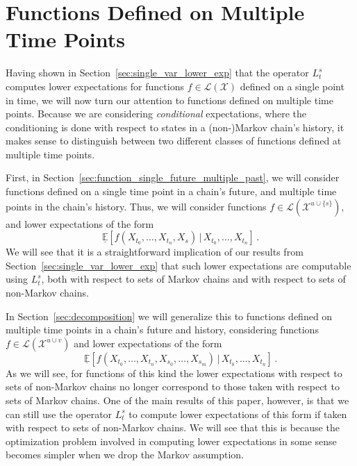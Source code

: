 \documentclass[10pt]{paper}
\theoremstyle{definition}
\newcommand{\states}{\mathcal{X}}
\newcommand{\gambles}{\mathcal{L}}
\newcommand{\gamblesX}{\gambles(\states)}
\begin{document}
\section{Functions Defined on Multiple Time Points}\label{sec:funcs_multi_time_points}

Having shown in Section~\ref{sec:single_var_lower_exp} that the operator $L_t^s$ computes lower expectations for functions $f\in\gamblesX$ defined on a single point in time, we will now turn our attention to functions defined on multiple time points. Because we are considering \emph{conditional} expectations, where the conditioning is done with respect to states in a (non-)Markov chain's history, it makes sense to distinguish between two different classes of functions defined at multiple time points. 

First, in Section~\ref{sec:function_single_future_multiple_past}, we will consider functions defined on a single time point in a chain's future, and multiple time points in the chain's history. Thus, we will consider functions $f\in\gambles(\states^{u\cup\{s\}})$, and lower expectations of the form
\begin{equation*}
\underline{\mathbb{E}}\left[f(X_{t_0},\ldots,X_{t_n},X_s)\,\vert\,X_{t_0},\ldots,X_{t_n}\right]\,.
\end{equation*}
We will see that it is a straightforward implication of our results from Section~\ref{sec:single_var_lower_exp} that such lower expectations are computable using $L_t^s$, both with respect to sets of Markov chains and with respect to sets of non-Markov chains.

In Section~\ref{sec:decomposition} we will generalize this to functions defined on multiple time points in a chain's future and history, considering functions $f\in\gambles(\states^{u\cup v})$ and lower expectations of the form
\begin{equation*}
\underline{\mathbb{E}}\left[f(X_{t_0},\ldots,X_{t_n},X_{s_0},\ldots,X_{s_m})\,\vert\,X_{t_0},\ldots,X_{t_n}\right]\,.
\end{equation*}
As we will see, for functions of this kind the lower expectations with respect to sets of non-Markov chains no longer correspond to those taken with respect to sets of Markov chains. One of the main results of this paper, however, is that we can still use the operator $L_t^s$ to compute lower expectations of this form if taken with respect to sets of non-Markov chains. We will see that this is because the optimization problem involved in computing lower expectations in some sense becomes simpler when we drop the Markov assumption.
\end{document}
